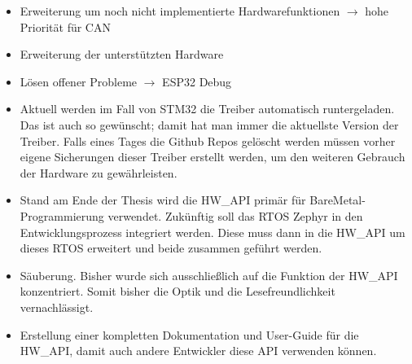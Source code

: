 \begin{itemize}
	\item Erweiterung um noch nicht implementierte Hardwarefunktionen $\rightarrow$ hohe Priorität für CAN
	\item Erweiterung der unterstützten Hardware
	\item Lösen offener Probleme $\rightarrow$ ESP32 Debug
	\item Aktuell werden im Fall von STM32 die Treiber automatisch runtergeladen. Das ist auch so gewünscht; damit hat man immer die aktuellste Version der Treiber. Falls eines Tages die Github Repos gelöscht werden müssen vorher eigene Sicherungen dieser Treiber erstellt werden, um den weiteren Gebrauch der Hardware zu gewährleisten.
	\item Stand am Ende der Thesis wird die HW\_API primär für BareMetal-Programmierung verwendet. Zukünftig soll das RTOS Zephyr in den Entwicklungsprozess integriert werden. Diese muss dann in die HW\_API um dieses RTOS erweitert und beide zusammen geführt werden.
	\item Säuberung. Bisher wurde sich ausschließlich auf die Funktion der HW\_API konzentriert. Somit bisher die Optik und die Lesefreundlichkeit vernachlässigt.
	\item Erstellung einer kompletten Dokumentation und User-Guide für die HW\_API, damit auch andere Entwickler diese API verwenden können.
\end{itemize}